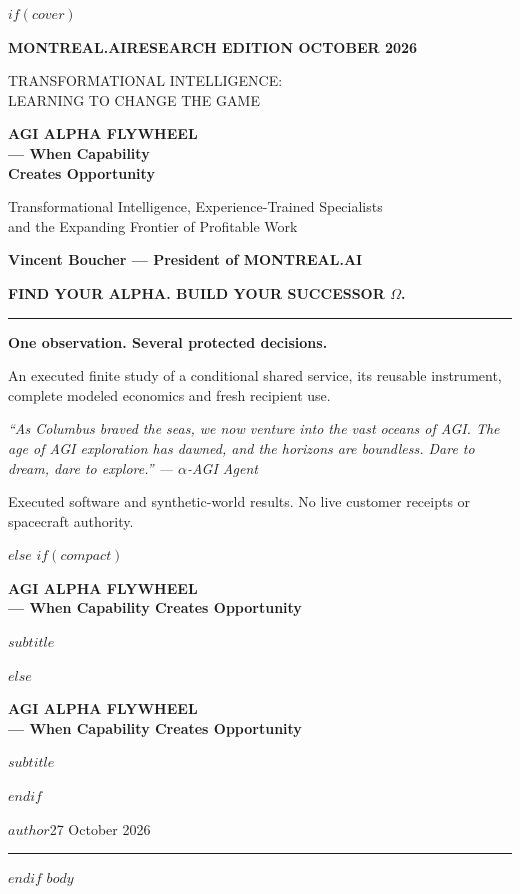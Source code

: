 \documentclass[10pt,letterpaper]{article}
\begin{document}
$if(cover)$
\begin{titlepage}
\color{navy}
{\sffamily\small\bfseries MONTREAL.AI\hfill RESEARCH EDITION OCTOBER 2026\par}
\vspace{1.4cm}
{\sffamily\small\color{teal} TRANSFORMATIONAL INTELLIGENCE:\\ LEARNING TO CHANGE THE GAME\par}
\vspace{0.8cm}
{\sffamily\fontsize{28}{33}\selectfont\bfseries AGI ALPHA FLYWHEEL\\[0.35cm]
\fontsize{24}{29}\selectfont — When Capability\\ Creates Opportunity\par}
\vspace{0.65cm}
{\sffamily\large Transformational Intelligence, Experience-Trained Specialists\\
and the Expanding Frontier of Profitable Work\par}
\vspace{0.8cm}
{\large\bfseries Vincent Boucher --- President of MONTREAL.AI\par}
\vspace{0.9cm}
{\sffamily\color{teal}\bfseries FIND YOUR ALPHA. BUILD YOUR SUCCESSOR \(\Omega\).\par}
\vfill
\rule{\textwidth}{0.5pt}
{\sffamily\large\bfseries One observation. Several protected decisions.\par}
{\normalsize An executed finite study of a conditional shared service, its reusable instrument,
complete modeled economics and fresh recipient use.\par}
\vspace{0.5cm}
{\small\itshape ``As Columbus braved the seas, we now venture into the vast oceans of AGI.
The age of AGI exploration has dawned, and the horizons are boundless.
Dare to dream, dare to explore.'' --- \(\alpha\)-AGI Agent\par}
\vspace{0.5cm}
{\sffamily\footnotesize Executed software and synthetic-world results. No live customer receipts or spacecraft authority.}
\end{titlepage}
$else$
$if(compact)$
{\sffamily\fontsize{17}{20}\selectfont\bfseries\color{navy}AGI ALPHA FLYWHEEL\\— When Capability Creates Opportunity\par}
{\sffamily\normalsize\color{teal}$subtitle$\par}
$else$
{\sffamily\fontsize{18}{22}\selectfont\bfseries\color{navy}AGI ALPHA FLYWHEEL\\— When Capability Creates Opportunity\par}
{\sffamily\large\color{teal}$subtitle$\par}
$endif$
{\normalsize $author$\hfill 27 October 2026\par}
\vspace{0.3cm}\hrule\vspace{0.3cm}
$endif$
$body$
\end{document}
